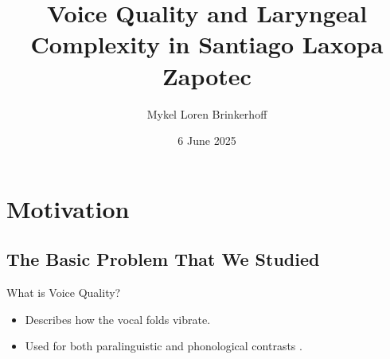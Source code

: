 \documentclass{beamer}
\title[Voice Quality in SLZ] %
{Voice Quality and Laryngeal Complexity in Santiago Laxopa Zapotec}
\author[Brinkerhoff] %
{Mykel Loren Brinkerhoff}
\institute[UC Santa Cruz] %
{University of California, Santa Cruz}
\date[2025-06-06] %
{6 June 2025}
\begin{document}
\begin{frame}
  \titlepage
\end{frame}





\section{Motivation}
\subsection{The Basic Problem That We Studied}
\begin{frame}{What is Voice Quality?}

  \begin{itemize}
  \item
    Describes how the vocal folds vibrate.
  \item
    Used for both paralinguistic \citep[e.g.,][]{laverVoiceQualityIndexical1968,podesvaStanceWindowLanguageRace2016} and phonological contrasts \citep[e.g.,][]{espositoCrosslinguisticPatternsPhonation2020}.
  \end{itemize}
\end{frame}
\end{document}
